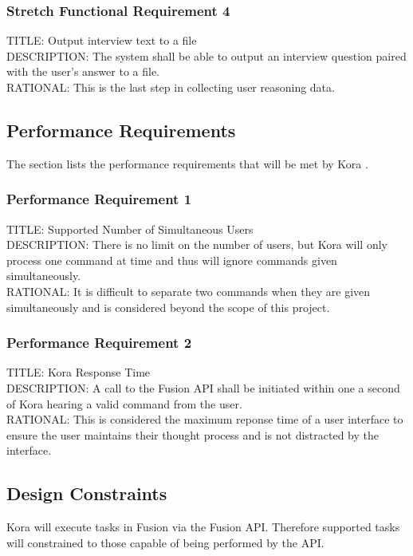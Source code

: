 \documentclass[onecolumn, draftclsnofoot,10pt, compsoc]{IEEEtran}
\def \botname{Kora }
\begin{document}
        \subsubsection{Stretch Functional Requirement 4}
        TITLE: Output interview text to a file \\
        DESCRIPTION: The system shall be able to output an interview question paired with the user's answer to a file. \\
        RATIONAL: This is the last step in collecting user reasoning data. 
        

    \subsection{Performance Requirements}
        The section lists the performance requirements that will be met by \botname.
        
        \subsubsection{Performance Requirement 1}
        TITLE: Supported Number of Simultaneous Users \\
        DESCRIPTION: There is no limit on the number of users, but \botname will only process one command at time and thus will ignore commands given simultaneously. \\
        RATIONAL: It is difficult to separate two commands when they are given simultaneously and is considered beyond the scope of this project.
        
        \subsubsection{Performance Requirement 2}
        TITLE: \botname Response Time \\
        DESCRIPTION: A call to the Fusion API shall be initiated within one a second of \botname hearing a valid command from the user. \\
        RATIONAL: This is considered the maximum reponse time of a user interface to ensure the user maintains their thought process and is not distracted by the interface.
        
    \subsection{Design Constraints}
        \botname will execute tasks in Fusion via the Fusion API. 
        Therefore supported tasks will constrained to those capable of being performed by the API.
        
\end{document}
